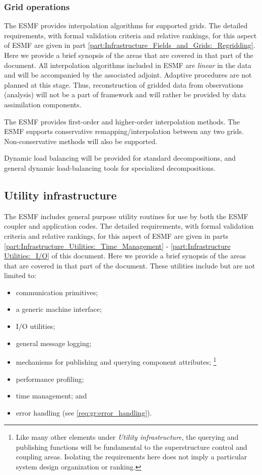 \subsubsection{Grid operations}

The ESMF provides interpolation algorithms for supported grids.  
The detailed requirements, with formal validation criteria
and relative rankings, for this aspect of ESMF are given
in part \ref{part:Infrastructure_Fields_and_Grids:_Regridding}.
Here we provide a brief synopsis of the areas that are covered
in that part of the document.
All interpolation algorithms included in ESMF are {\it linear} in the data
and will be accompanied by the associated adjoint.  Adaptive
procedures are not planned at this stage. Thus, reconstruction of
gridded data from observations (analysis) will not be a part of
framework and will rather be provided by data assimilation components.

The ESMF provides first-order and higher-order interpolation 
methods.  The ESMF supports conservative remapping/interpolation 
between any two grids. Non-conservative methods will also 
be supported.

Dynamic load balancing will be provided for standard decompositions, 
and general dynamic load-balancing tools for specialized decompositions.

\subsection{Utility infrastructure}
The ESMF includes general purpose utility routines for use by both 
the ESMF coupler and application codes.
The detailed requirements, with formal validation criteria
and relative rankings, for this aspect of ESMF are given
in parts \ref{part:Infrastructure_Utilities:_Time_Management} -
 \ref{part:Infrastructure Utilities:_I/O} of this document.
Here we provide a brief synopsis of the areas that are covered
in that part of the document.
These utilities include 
but are not limited to:
\begin{itemize}
\item communication primitives;
\item a generic machine interface;
\item I/O utilities;
\item general message logging;
\item mechanisms for publishing and querying component attributes;
\footnote{Like many other elements under
{\it Utility infrastructure}, the querying and publishing functions will be 
fundamental to the superstructure control and coupling areas. Isolating the
requirements here does not imply a particular system design organization
or ranking.
}
\item performance profiling;
\item time management; and
\item error handling (see \ref{req:gr:error_handling}).
\end{itemize}


